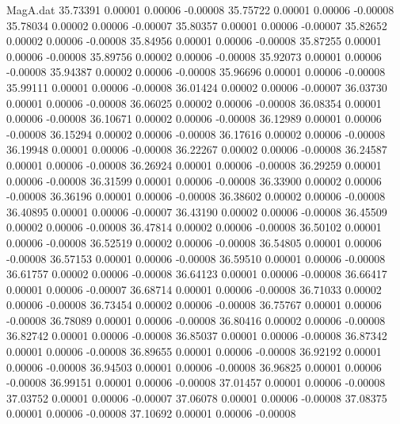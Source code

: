 \begin{filecontents}{MagA.dat}
  35.73391    0.00001    0.00006   -0.00008
  35.75722    0.00001    0.00006   -0.00008
  35.78034    0.00002    0.00006   -0.00007
  35.80357    0.00001    0.00006   -0.00007
  35.82652    0.00002    0.00006   -0.00008
  35.84956    0.00001    0.00006   -0.00008
  35.87255    0.00001    0.00006   -0.00008
  35.89756    0.00002    0.00006   -0.00008
  35.92073    0.00001    0.00006   -0.00008
  35.94387    0.00002    0.00006   -0.00008
  35.96696    0.00001    0.00006   -0.00008
  35.99111    0.00001    0.00006   -0.00008
  36.01424    0.00002    0.00006   -0.00007
  36.03730    0.00001    0.00006   -0.00008
  36.06025    0.00002    0.00006   -0.00008
  36.08354    0.00001    0.00006   -0.00008
  36.10671    0.00002    0.00006   -0.00008
  36.12989    0.00001    0.00006   -0.00008
  36.15294    0.00002    0.00006   -0.00008
  36.17616    0.00002    0.00006   -0.00008
  36.19948    0.00001    0.00006   -0.00008
  36.22267    0.00002    0.00006   -0.00008
  36.24587    0.00001    0.00006   -0.00008
  36.26924    0.00001    0.00006   -0.00008
  36.29259    0.00001    0.00006   -0.00008
  36.31599    0.00001    0.00006   -0.00008
  36.33900    0.00002    0.00006   -0.00008
  36.36196    0.00001    0.00006   -0.00008
  36.38602    0.00002    0.00006   -0.00008
  36.40895    0.00001    0.00006   -0.00007
  36.43190    0.00002    0.00006   -0.00008
  36.45509    0.00002    0.00006   -0.00008
  36.47814    0.00002    0.00006   -0.00008
  36.50102    0.00001    0.00006   -0.00008
  36.52519    0.00002    0.00006   -0.00008
  36.54805    0.00001    0.00006   -0.00008
  36.57153    0.00001    0.00006   -0.00008
  36.59510    0.00001    0.00006   -0.00008
  36.61757    0.00002    0.00006   -0.00008
  36.64123    0.00001    0.00006   -0.00008
  36.66417    0.00001    0.00006   -0.00007
  36.68714    0.00001    0.00006   -0.00008
  36.71033    0.00002    0.00006   -0.00008
  36.73454    0.00002    0.00006   -0.00008
  36.75767    0.00001    0.00006   -0.00008
  36.78089    0.00001    0.00006   -0.00008
  36.80416    0.00002    0.00006   -0.00008
  36.82742    0.00001    0.00006   -0.00008
  36.85037    0.00001    0.00006   -0.00008
  36.87342    0.00001    0.00006   -0.00008
  36.89655    0.00001    0.00006   -0.00008
  36.92192    0.00001    0.00006   -0.00008
  36.94503    0.00001    0.00006   -0.00008
  36.96825    0.00001    0.00006   -0.00008
  36.99151    0.00001    0.00006   -0.00008
  37.01457    0.00001    0.00006   -0.00008
  37.03752    0.00001    0.00006   -0.00007
  37.06078    0.00001    0.00006   -0.00008
  37.08375    0.00001    0.00006   -0.00008
  37.10692    0.00001    0.00006   -0.00008

\end{filecontents}
